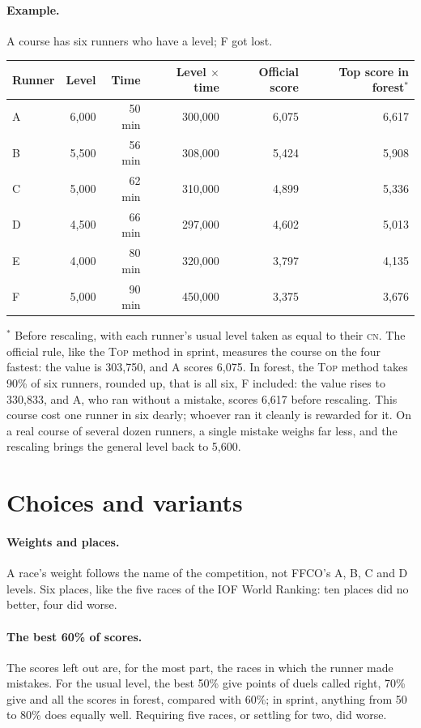 \documentclass[11pt,a4paper]{article}
\newcommand{\Top}{\textsc{Top}}
\newcommand{\CN}{\textsc{cn}}
\begin{document}
\paragraph{Example.} A course has six runners who have a level; F got lost.
\begin{center}\small
\begin{tabular}{@{}lrrrrr@{}}\toprule
Runner & Level & Time & Level $\times$ time & Official score & Top score in forest$^*$ \\ \midrule
A & 6,000 & 50 min & 300,000 & 6,075 & 6,617 \\
B & 5,500 & 56 min & 308,000 & 5,424 & 5,908 \\
C & 5,000 & 62 min & 310,000 & 4,899 & 5,336 \\
D & 4,500 & 66 min & 297,000 & 4,602 & 5,013 \\
E & 4,000 & 80 min & 320,000 & 3,797 & 4,135 \\
F & 5,000 & 90 min & 450,000 & 3,375 & 3,676 \\ \bottomrule
\end{tabular}
\end{center}
$^*$ Before rescaling, with each runner's usual level taken as equal to their \CN. The official rule, like the \Top{} method in sprint, measures the course on the four fastest: the value is 303,750, and A scores 6,075. In forest, the \Top{} method takes 90\% of six runners, rounded up, that is all six, F included: the value rises to 330,833, and A, who ran without a mistake, scores 6,617 before rescaling. This course cost one runner in six dearly; whoever ran it cleanly is rewarded for it. On a real course of several dozen runners, a single mistake weighs far less, and the rescaling brings the general level back to 5,600.

\section{Choices and variants}

\paragraph{Weights and places.} A race's weight follows the name of the competition, not FFCO's A, B, C and D levels. Six places, like the five races of the IOF World Ranking: ten places did no better, four did worse.

\paragraph{The best 60\% of scores.} The scores left out are, for the most part, the races in which the runner made mistakes. For the usual level, the best 50\% give \NeligFifty{} points of duels called right, 70\% give \NeligSeventy{} and all the scores \NeligAll{} in forest, compared with 60\%; in sprint, anything from 50 to 80\% does equally well. Requiring five races, or settling for two, did worse.
\end{document}
